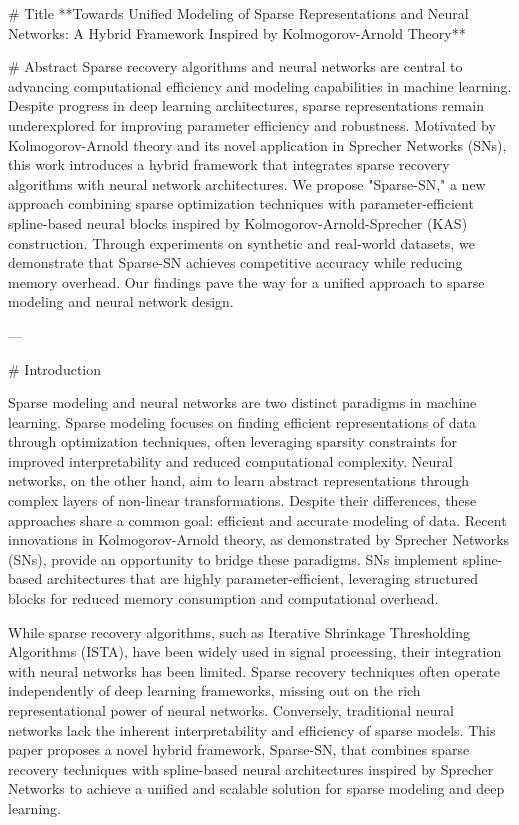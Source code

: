 # Title  
**Towards Unified Modeling of Sparse Representations and Neural Networks: A Hybrid Framework Inspired by Kolmogorov-Arnold Theory**

# Abstract  
Sparse recovery algorithms and neural networks are central to advancing computational efficiency and modeling capabilities in machine learning. Despite progress in deep learning architectures, sparse representations remain underexplored for improving parameter efficiency and robustness. Motivated by Kolmogorov-Arnold theory and its novel application in Sprecher Networks (SNs), this work introduces a hybrid framework that integrates sparse recovery algorithms with neural network architectures. We propose "Sparse-SN," a new approach combining sparse optimization techniques with parameter-efficient spline-based neural blocks inspired by Kolmogorov-Arnold-Sprecher (KAS) construction. Through experiments on synthetic and real-world datasets, we demonstrate that Sparse-SN achieves competitive accuracy while reducing memory overhead. Our findings pave the way for a unified approach to sparse modeling and neural network design.

---

# Introduction  

Sparse modeling and neural networks are two distinct paradigms in machine learning. Sparse modeling focuses on finding efficient representations of data through optimization techniques, often leveraging sparsity constraints for improved interpretability and reduced computational complexity. Neural networks, on the other hand, aim to learn abstract representations through complex layers of non-linear transformations. Despite their differences, these approaches share a common goal: efficient and accurate modeling of data. Recent innovations in Kolmogorov-Arnold theory, as demonstrated by Sprecher Networks (SNs), provide an opportunity to bridge these paradigms. SNs implement spline-based architectures that are highly parameter-efficient, leveraging structured blocks for reduced memory consumption and computational overhead.

While sparse recovery algorithms, such as Iterative Shrinkage Thresholding Algorithms (ISTA), have been widely used in signal processing, their integration with neural networks has been limited. Sparse recovery techniques often operate independently of deep learning frameworks, missing out on the rich representational power of neural networks. Conversely, traditional neural networks lack the inherent interpretability and efficiency of sparse models. This paper proposes a novel hybrid framework, Sparse-SN, that combines sparse recovery techniques with spline-based neural architectures inspired by Sprecher Networks to achieve a unified and scalable solution for sparse modeling and deep learning.

